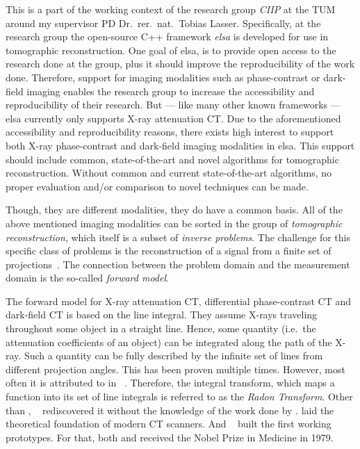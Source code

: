 This is a part of the working context of the research group \textit{\gls{CIIP}} at the \gls{TUM}
around my supervisor PD Dr.\ rer.\ nat.\ Tobias Lasser. Specifically, at the research group the
open-source C++ framework \textit{elsa} is developed for use in tomographic reconstruction. One goal
of elsa, is to provide open access to the research done at the group, plus it should improve the
reproducibility of the work done. Therefore, support for imaging modalities such as phase-contrast
or dark-field imaging enables the research group to increase the accessibility and reproducibility
of their research. But --- like many other known frameworks --- elsa currently only supports X-ray
attenuation CT\@. Due to the aforementioned accessibility and reproducibility reasons, there exists
high interest to support both X-ray phase-contrast and dark-field imaging modalities in elsa. This
support should include common, state-of-the-art and novel algorithms for tomographic reconstruction.
Without common and current state-of-the-art algorithms, no proper evaluation and/or comparison to
novel techniques can be made.

Though, they are different modalities, they do have a common basis. All of the above mentioned
imaging modalities can be sorted in the group of \textit{tomographic reconstruction}, which itself
is a subset of \textit{inverse problems}. The challenge for this specific class of problems is the
reconstruction of a signal from a finite set of projections~\cite{herman_basis_2015}. The connection
between the problem domain and the measurement domain is the so-called \textit{forward model}.

The forward model for X-ray attenuation CT, differential phase-contrast CT and dark-field CT is
based on the line integral. They assume X-rays traveling throughout some object in a straight line.
Hence, some quantity (i.e.\ the attenuation coefficients of an object) can be integrated along the
path of the X-ray. Such a quantity can be fully described by the infinite set of lines from
different projection angles. This has been proven multiple times. However, most often it is
attributed to \citeauthor*{radon_uber_1917} in \citeyear{radon_uber_1917} ~\cite{radon_uber_1917}.
Therefore, the integral transform, which maps a function into its set of line integrals is referred
to as the \textit{Radon Transform}. Other than \citeauthor*{radon_uber_1917},
\citeauthor*{cormack_representation_1963}~\cite{cormack_representation_1963} rediscovered it without
the knowledge of the work done by \citeauthor*{radon_uber_1917}.
\citeauthor*{cormack_representation_1963} laid the theoretical foundation of modern CT scanners. And
\citeauthor*{hounsfield_computerized_1973}~\cite{hounsfield_computerized_1973} built the first
working prototypes. For that, both \citeauthor*{cormack_representation_1963} and
\citeauthor*{hounsfield_computerized_1973} received the Nobel Prize in Medicine in 1979.

